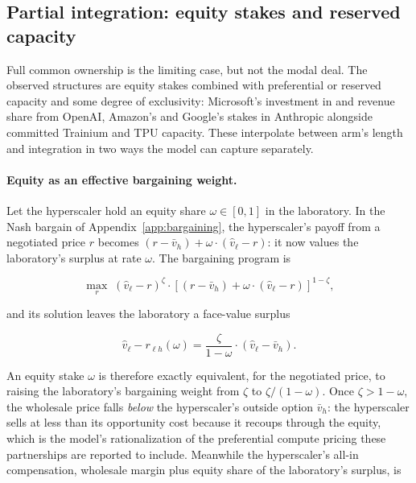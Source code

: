 \documentclass[11pt]{article}
\begin{document}
\subsection{Partial integration: equity stakes and reserved capacity}
\label{sec:integration-partial}

Full common ownership is the limiting case, but not the modal deal. The observed structures are equity stakes combined with preferential or reserved capacity and some degree of exclusivity: Microsoft's investment in and revenue share from OpenAI, Amazon's and Google's stakes in Anthropic alongside committed Trainium and TPU capacity. These interpolate between arm's length and integration in two ways the model can capture separately.

\paragraph{Equity as an effective bargaining weight.} Let the hyperscaler hold an equity share $\omega\in[0,1]$ in the laboratory. In the Nash bargain of Appendix~\ref{app:bargaining}, the hyperscaler's payoff from a negotiated price $r$ becomes $(r-\bar v_h)+\omega\cdot(\widehat v_\ell-r)$: it now values the laboratory's surplus at rate $\omega$. The bargaining program is

\begin{equation}\max_{r}\;\left(\widehat v_\ell-r\right)^{\zeta}\cdot\left[\left(r-\bar v_h\right)+\omega\cdot\left(\widehat v_\ell-r\right)\right]^{1-\zeta},\end{equation}

and its solution leaves the laboratory a face-value surplus

\begin{equation}\widehat v_\ell-r_{\ell h}(\omega)=\frac{\zeta}{1-\omega}\cdot\left(\widehat v_\ell-\bar v_h\right).\end{equation}

An equity stake $\omega$ is therefore exactly equivalent, for the negotiated price, to raising the laboratory's bargaining weight from $\zeta$ to $\zeta/(1-\omega)$. Once $\zeta>1-\omega$, the wholesale price falls \emph{below} the hyperscaler's outside option $\bar v_h$: the hyperscaler sells at less than its opportunity cost because it recoups through the equity, which is the model's rationalization of the preferential compute pricing these partnerships are reported to include. Meanwhile the hyperscaler's all-in compensation, wholesale margin plus equity share of the laboratory's surplus, is
\end{document}
